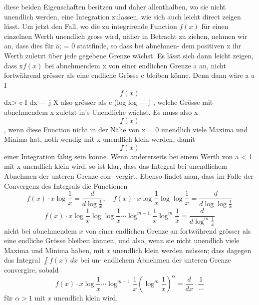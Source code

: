 \documentclass[11pt,a4paper]{article}
\begin{document}
{{{{%
diese  beiden  Eigenschaften  besitzen  und  daher  allenthalben,  wo  sie
nicht  unendlich  werden,  eine  Integration  zulassen,  wie  sich  auch  leicht
direct  zeigen  lässt.
Um  jetzt  den  Fall,  wo  die  zu  integrirende  Function  $f(x)$  für  einen
einzelnen  Werth  unendlich  gross  wird,  näher  in  Betracht  zu  ziehen,
nehmen  wir  an,  dass  dies  für  ä;  =  0  stattfinde,  so  dass  bei  abnehmen-
dem positiven  x  ihr  Werth  zuletzt  über  jede  gegebene  Grenze  wächst.
Es  lässt  sich  dann  leicht  zeigen,  dass  x$f(x)$  bei  abnehmendem  x
von  einer  endlichen  Grenze  a  an,  nicht  fortwährend  grösser  als  eine
endliche  Grösse  c  bleiben  könne.     Denn  dann  wäre
a  a
I
$$f(x)$$  dx>  c  I
dx
---  j
X
also  grösser  als  c  (log   log  --- j ,  welche  Grösse  mit  abnehmendem
x  zuletzt  in's  Unendliche  wächst.  Es  muss  also  x$$f(x)$$,  wenn  diese
Function  nicht  in  der  Nähe  von  x  =  0  unendlich  viele  Maxima  und
Minima  hat,  noth wendig  mit  x  unendlich  klein  werden,  damit  $$f(x)$$
einer  Integration  fähig  sein  könne.     Wenn  andererseits
bei  einem  Werth  von  a  <  1  mit  x  unendlich  klein  wird,  so  ist  klar,
dass  das  Integral  bei  unendlichem  Abnehmen  der  unteren  Grenze  con-
vergirt.
Ebenso  findet  man,  dass  im  Falle  der  Convergenz  des  Integrals
die  Functionen
\[ f(x) \cdot x \log \frac{1}{x} = \frac{d}{d\log\frac{1}{x}}, \quad f(x) \cdot x \log\frac{1}{x} \log\log\frac{1}{x} = \frac{d}{d\log\log\frac{1}{x}} \]
\[ f(x) \cdot x \log\frac{1}{x} \log\log\frac{1}{x} \cdots \log^{m-1}\frac{1}{x} \log^m\frac{1}{x} = \frac{d}{d\log^m\frac{1}{x}} \]
nicht  bei  abnehmendem  $x$  von  einer  endlichen  Grenze  an  fortwährend
grösser  als  eine  endliche  Grösse  bleiben  können,  und  also,  wenn  sie
nicht  unendlich  viele  Maxima  und  Minima  haben,  mit  $x$  unendlich
klein  werden  müssen;  dass  dagegen  das  Integral  $\int f(x)\, dx$  bei  un-
endlichem Abnehmen  der  unteren  Grenze  convergire,  sobald
\[ f(x) \cdot x \log\frac{1}{x} \cdots \log^{m-1}\frac{1}{x} \left(\log^m\frac{1}{x}\right)^\alpha = \frac{d}{dx} \cdot \frac{1}{\cdots} \]
für  $\alpha > 1$  mit  $x$  unendlich  klein  wird.
\newpage

}}}}
\end{document}
